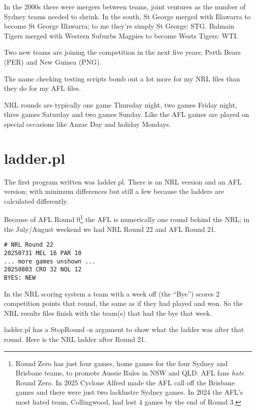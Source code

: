 \documentclass{article}
\begin{document}
In the 2000s there were mergers between teams, joint ventures as
the number of Sydney teams needed to shrink. In the south, St George
merged with Illawarra to become St George Illawarra; to me they're
simply St George: STG. Balmain Tigers merged with Western Suburbs
Magpies to become Wests Tigers: WTI.

Two new teams are joining the competition in the next five years;
Perth Bears (PER) and New Guinea (PNG).

The name checking testing scripts bomb out a lot more for my NRL files
than they do for my AFL files.

NRL rounds are typically one game Thursday night, two games Friday
night, three games Saturday and two games Sunday. Like the AFL games
are played on special occasions like Anzac Day and holiday Mondays.

\section{ladder.pl}

The first program written was ladder.pl. There is an NRL version and
an AFL version; with minimum differences but still a few because the
ladders are calculated differently.

Because of AFL Round 0\footnote{Round Zero has just four games, home
games for the four Sydney and Brisbane teams, to promote
Aussie Rules in NSW and QLD.  AFL fans \emph{hate}
Round Zero. In 2025 Cyclone Alfred made the AFL call off the
Brisbane games and there were just two lacklustre Sydney games.
In 2024 the AFL's most hated team, Collingwood, had lost 4 games by
the end of Round 3.} the AFL is numerically one round behind the NRL;
in the July/August weekend we had NRL Round 22 and AFL Round 21.

\begin{verbatim}
# NRL Round 22
20250731 MEL 16 PAR 10
... more games unshown ...
20250803 CRO 32 NQL 12
BYES: NEW
\end{verbatim}

In the NRL scoring system a team with a week off (the ``Bye'') scores
2 competition points that round, the same as if they had played and
won. So the NRL results files finish with the team(s) that had the bye
that week.

ladder.pl has a StopRound -n argument to show what the ladder was
after that round. Here is the NRL ladder after Round 21.
\end{document}
